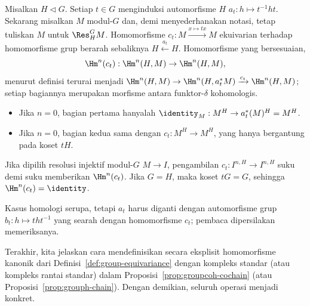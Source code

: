 \begin{example}[Konjugasi]\label{eg:change-of-group-conj}
	Misalkan $H\lhd G$. Setiap $t\in G$ menginduksi automorfisme $H$
	$a_t:h\mapsto t^{-1}ht$. Sekarang misalkan $M$ modul-$G$ dan, demi
	menyederhanakan notasi, tetap tuliskan $M$ untuk $\Res^G_HM$. Homomorfisme
	$c_t:M\xrightarrow{x\mapsto tx}M$ ekuivarian terhadap homomorfisme grup
	berarah sebaliknya $H\xleftarrow{a_t}H$. Homomorfisme yang bersesuaian,
	\[ \Hm^n(c_t): \Hm^n(H, M) \to \Hm^n(H, M), \]
	menurut definisi terurai menjadi
	$\Hm^n(H,M)\to\Hm^n(H,a_t^*M)\xrightarrow{c_t}\Hm^n(H,M)$; setiap
	bagiannya merupakan morfisme antara funktor-$\delta$ kohomologis.
	\begin{itemize}
		\item Jika $n=0$, bagian pertama hanyalah
		$\identity_M:M^H\to a_t^*(M)^H=M^H$.
		\item Jika $n=0$, bagian kedua sama dengan $c_t:M^H\to M^H$, yang hanya
		bergantung pada koset $tH$.
	\end{itemize}
	Jika dipilih resolusi injektif modul-$G$ $M\to I$, pengambilan
	$c_t:I^{n,H}\to I^{n,H}$ suku demi suku memberikan $\Hm^n(c_t)$. Jika
	$G=H$, maka koset $tG=G$, sehingga $\Hm^n(c_t)=\identity$.

	Kasus homologi serupa, tetapi $a_t$ harus diganti dengan automorfisme grup
	$b_t:h\mapsto tht^{-1}$ yang searah dengan homomorfisme $c_t$; pembaca
	dipersilakan memeriksanya.
\end{example}

Terakhir, kita jelaskan cara mendefinisikan secara eksplisit homomorfisme
kanonik dari Definisi~\ref{def:group-equivariance} dengan kompleks standar
(atau kompleks rantai standar) dalam
Proposisi~\ref{prop:groupcoh-cochain} (atau
Proposisi~\ref{prop:grouph-chain}). Dengan demikian, seluruh operasi menjadi konkret.

